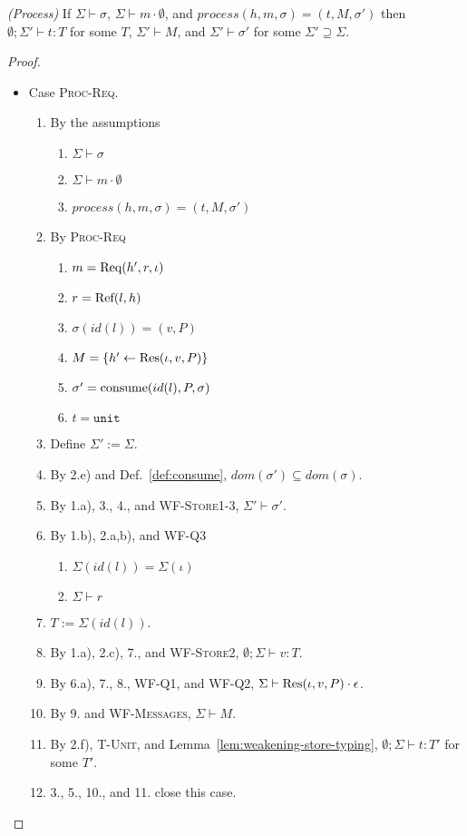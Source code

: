 \begin{lemun}\emph{(Process)}\label{lem:process}
If $\Sigma \vdash \sigma$, $\Sigma \vdash m \cdot \emptyset$, and $process(h, m, \sigma) = (t, M, \sigma')$ then $\emptyset ; \Sigma' \vdash t : T$ for some $T$, $\Sigma' \vdash M$, and $\Sigma' \vdash \sigma'$ for some $\Sigma' \supseteq \Sigma$.
\end{lemun}
\begin{proof}
\begin{itemize}
\item Case \textsc{Proc-Req}.
\begin{enumerate}
\item By the assumptions
  \begin{enumerate}[label=(\alph*)]
  \item $\Sigma \vdash \sigma$
  \item $\Sigma \vdash m \cdot \emptyset$
  \item $process(h, m, \sigma) = (t, M, \sigma')$
  \end{enumerate}
\item By \textsc{Proc-Req}
  \begin{enumerate}[label=(\alph*)]
  \item $m = {\textrm{Req}(h', r, \iota)}$
  \item $r = {\textrm{Ref}(l, h)}$
  \item $\sigma(id(l)) = (v, P)$
  \item $M = \{ h' \leftarrow {\textrm{Res}(\iota, v, P)} \}$
  \item $\sigma' = {\textrm{consume}(id(l), P, \sigma)}$
  \item $t = \texttt{unit}$
  \end{enumerate}
\item Define $\Sigma' := \Sigma$.
\item By 2.e) and Def.~\ref{def:consume}, $dom(\sigma') \subseteq dom(\sigma)$.
\item By 1.a), 3., 4., and \textsc{WF-Store1-3}, $\Sigma' \vdash \sigma'$.
\item By 1.b), 2.a,b), and \textsc{WF-Q3}
  \begin{enumerate}[label=(\alph*)]
  \item $\Sigma(id(l)) = \Sigma(\iota)$
  \item $\Sigma \vdash r$
  \end{enumerate}
\item $T := \Sigma(id(l))$.
\item By 1.a), 2.c), 7., and \textsc{WF-Store2}, $\emptyset ; \Sigma \vdash v : T$.
\item By 6.a), 7., 8., \textsc{WF-Q1}, and \textsc{WF-Q2}, $\Sigma \vdash {\textrm{Res}(\iota, v, P)} \cdot \epsilon$.
\item By 9. and \textsc{WF-Messages}, $\Sigma \vdash M$.
\item By 2.f), \textsc{T-Unit}, and Lemma~\ref{lem:weakening-store-typing}, $\emptyset ; \Sigma \vdash t : T'$ for some $T'$.
\item 3., 5., 10., and 11. close this case.
\end{enumerate}


\end{itemize}
\end{proof}
